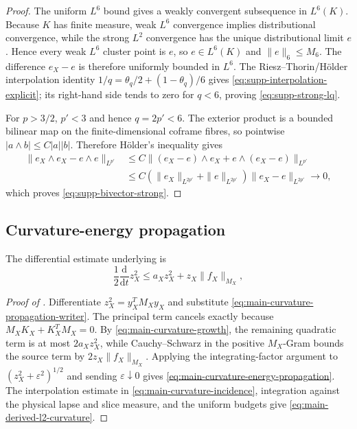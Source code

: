 \documentclass[11pt]{article}
\numberwithin{equation}{section}
\theoremstyle{definition}
\theoremstyle{remark}
\newcommand{\dd}{\mathrm d}
\begin{document}
\begin{proof}
The uniform $L^6$ bound gives a weakly convergent subsequence in $L^6(K)$.
Because $K$ has finite measure, weak $L^6$ convergence implies distributional
convergence, while the strong $L^2$ convergence has the unique distributional
limit $e$.  Hence every weak $L^6$ cluster point is $e$, so $e\in L^6(K)$ and
$\|e\|_6\le M_6$.  The difference $e_X-e$ is therefore uniformly bounded in
$L^6$.  The Riesz--Thorin/H\"older interpolation identity
$1/q=\theta_q/2+(1-\theta_q)/6$ gives
\eqref{eq:supp-interpolation-explicit}; its right-hand side tends to zero for
$q<6$, proving \eqref{eq:supp-strong-lq}.

For $p>3/2$, $p'<3$ and hence $q=2p'<6$.  The exterior product is a bounded
bilinear map on the finite-dimensional coframe fibres, so pointwise
$|a\wedge b|\le C|a||b|$.  Therefore H\"older's inequality gives
\begin{align}
 \|e_X\wedge e_X-e\wedge e\|_{L^{p'}}
 &\le C\|(e_X-e)\wedge e_X+e\wedge(e_X-e)\|_{L^{p'}} \\
 &\le C(\|e_X\|_{L^{2p'}}+\|e\|_{L^{2p'}})
       \|e_X-e\|_{L^{2p'}}\longrightarrow0,
\end{align}
which proves \eqref{eq:supp-bivector-strong}.
\end{proof}

\subsection{Curvature-energy propagation}

The differential estimate underlying
 is
\begin{equation}
 \frac12\frac{\dd}{\dd t}z_X^2
 \le a_Xz_X^2+z_X\|f_X\|_{M_X},
 \label{eq:supp-curvature-energy-differential}
\end{equation}

\begin{proof}[Proof of ]
Differentiate $z_X^2=y_X^TM_Xy_X$ and substitute
\eqref{eq:main-curvature-propagation-writer}.  The principal term cancels
exactly because $M_XK_X+K_X^TM_X=0$.  By
\eqref{eq:main-curvature-growth}, the remaining quadratic term is at most
$2a_Xz_X^2$, while Cauchy--Schwarz in the positive $M_X$-Gram bounds the source
term by $2z_X\|f_X\|_{M_X}$.  Applying the integrating-factor argument to
$(z_X^2+\varepsilon^2)^{1/2}$ and sending $\varepsilon\downarrow0$ gives
\eqref{eq:main-curvature-energy-propagation}.  The interpolation estimate in
\eqref{eq:main-curvature-incidence}, integration against the physical lapse and
slice measure, and the uniform budgets give
\eqref{eq:main-derived-l2-curvature}.
\end{proof}
\end{document}
